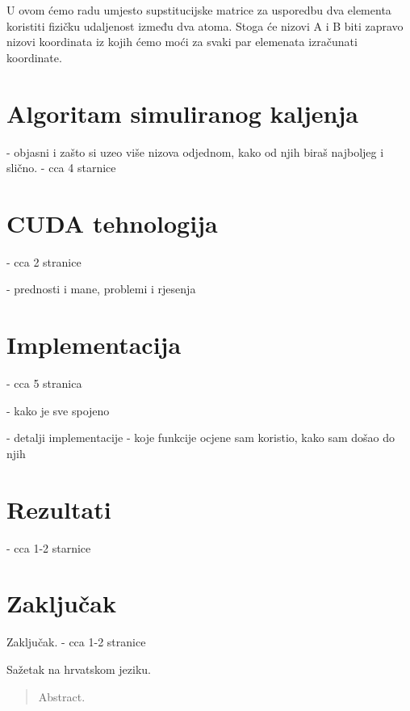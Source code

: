 \documentclass[times, utf8, zavrsni]{fer}
\begin{document}
U ovom ćemo radu umjesto supstitucijske matrice za usporedbu dva elementa
koristiti fizičku udaljenost između dva atoma. Stoga će nizovi A i B biti
zapravo nizovi koordinata iz kojih ćemo moći za svaki par elemenata
izračunati koordinate. 


\chapter{Algoritam simuliranog kaljenja}
- objasni i zašto si uzeo više nizova odjednom, kako od njih biraš najboljeg i slično.
- cca 4 starnice

\chapter{CUDA tehnologija}
- cca 2 stranice

- prednosti i mane, problemi i rjesenja

\chapter{Implementacija}
- cca 5 stranica

- kako je sve spojeno

- detalji implementacije - koje funkcije ocjene sam koristio, kako sam došao do njih

\chapter{Rezultati}
- cca 1-2 starnice

\chapter{Zaključak}
Zaključak.
- cca 1-2 stranice

{}


\begin{sazetak}
Sažetak na hrvatskom jeziku.

\end{sazetak}

\begin{abstract}
Abstract.

\end{abstract}
\end{document}
